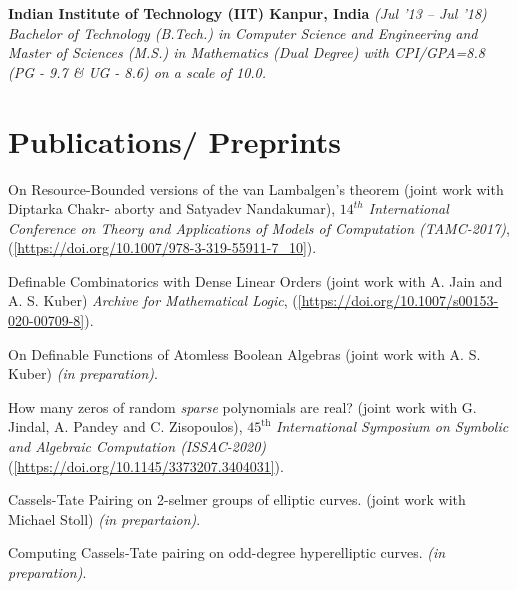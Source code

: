 \documentclass[margin,line]{resume}
\begin{document}
\begin{resume}
    \textbf{Indian Institute of Technology (IIT) Kanpur, India} \hfill \textit{ (Jul '13 -- Jul '18)} \vspace{1mm}\\\vspace{1mm}%
    \textsl{Bachelor of Technology (B.Tech.) in Computer Science and Engineering and Master of Sciences (M.S.) in Mathematics (Dual Degree) with CPI/GPA=8.8 (PG - 9.7 \& UG - 8.6) on a scale of 10.0.} \vspace{-6mm}\\

\section{\mysidestyle Publications/ Preprints}
\begin{list2}
        

\item On Resource-Bounded versions of the van Lambalgen's theorem (joint work with Diptarka Chakr- aborty and Satyadev Nandakumar), \emph{$14^{th}$ International Conference on Theory and Applications of Models of Computation (TAMC-2017)},(\href{https://doi.org/10.1007/978-3-319-55911-7_10}{\small{\color{blue}[https://doi.org/10.1007/978-3-319-55911-7\_10]}}).\vspace{1.5mm}
\item Definable Combinatorics with Dense Linear Orders (joint work with A. Jain and A. S. Kuber) \emph{Archive for Mathematical Logic}, (\href{https://doi.org/10.1007/s00153-020-00709-8}{\small{\color{blue}[https://doi.org/10.1007/s00153-020-00709-8]}}).\vspace{1.5mm}
\item On Definable Functions of Atomless Boolean Algebras (joint work with A. S. Kuber) \emph{(in preparation)}.
\item How many zeros of random \emph{sparse} polynomials are real? (joint work with G. Jindal, A. Pandey and C. Zisopoulos), $45^{\mathrm{th}}$ \emph{International Symposium on Symbolic and Algebraic Computation (ISSAC-2020)} (\href{https://doi.org/10.1145/3373207.3404031}{\small{\color{blue}[https://doi.org/10.1145/3373207.3404031]}}).
\item Cassels-Tate Pairing on 2-selmer groups of elliptic curves. (joint work with Michael Stoll) \emph{(in prepartaion)}.
\item Computing Cassels-Tate pairing on odd-degree hyperelliptic curves. \emph{(in preparation)}.
\end{list2}



\end{resume}
\end{document}
